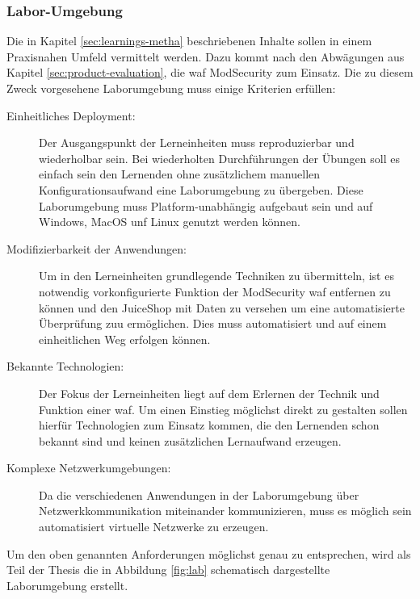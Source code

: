 \subsubsection{Labor-Umgebung}

Die in Kapitel \ref{sec:learnings-metha} beschriebenen Inhalte sollen in einem Praxisnahen Umfeld vermittelt werden.
Dazu kommt nach den Abwägungen aus Kapitel \ref{sec:product-evaluation}, die \ac{waf} ModSecurity zum Einsatz.
Die zu diesem Zweck vorgesehene Laborumgebung muss einige Kriterien erfüllen:
\begin{description}
    \item[Einheitliches Deployment:] Der Ausgangspunkt der Lerneinheiten muss reproduzierbar und wiederholbar sein. 
    Bei wiederholten Durchführungen der Übungen soll es einfach sein den Lernenden ohne zusätzlichem manuellen Konfigurationsaufwand eine Laborumgebung zu übergeben. 
    Diese Laborumgebung muss Platform-unabhängig aufgebaut sein und auf Windows, MacOS unf Linux genutzt werden können.
    \item[Modifizierbarkeit der Anwendungen:] Um in den Lerneinheiten grundlegende Techniken zu übermitteln, ist es notwendig vorkonfigurierte Funktion der ModSecurity \ac{waf} entfernen zu können und den JuiceShop mit Daten zu versehen um eine automatisierte Überprüfung zuu ermöglichen.
    Dies muss automatisiert und auf einem einheitlichen Weg erfolgen können.
    \item[Bekannte Technologien:] Der Fokus der Lerneinheiten liegt auf dem Erlernen der Technik und Funktion einer \ac{waf}. 
    Um einen Einstieg möglichst direkt zu gestalten sollen hierfür Technologien zum Einsatz kommen, die den Lernenden schon bekannt sind und keinen zusätzlichen Lernaufwand erzeugen.
    \item[Komplexe Netzwerkumgebungen:] Da die verschiedenen Anwendungen in der Laborumgebung über Netzwerkkommunikation miteinander kommunizieren, muss es möglich sein automatisiert virtuelle Netzwerke zu erzeugen.
\end{description}

Um den oben genannten Anforderungen möglichst genau zu entsprechen, wird als Teil der Thesis die in Abbildung \ref{fig:lab} schematisch dargestellte Laborumgebung erstellt.

